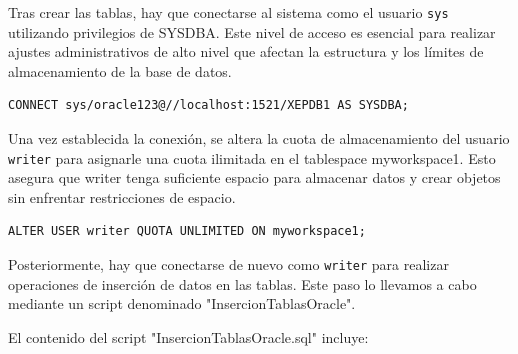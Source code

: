 \documentclass{article}
\begin{document}
Tras crear las tablas, hay que conectarse al sistema como el usuario \texttt{sys} utilizando privilegios de SYSDBA. Este nivel de acceso es esencial para realizar ajustes administrativos de alto nivel que afectan la estructura y los límites de almacenamiento de la base de datos.

\begin{lstlisting}[style=bashStyle]
CONNECT sys/oracle123@//localhost:1521/XEPDB1 AS SYSDBA;
\end{lstlisting}

Una vez establecida la conexión, se altera la cuota de almacenamiento del usuario \texttt{writer} para asignarle una cuota ilimitada en el tablespace myworkspace1. Esto asegura que writer tenga suficiente espacio para almacenar datos y crear objetos sin enfrentar restricciones de espacio.

\begin{lstlisting}[style=bashStyle]
ALTER USER writer QUOTA UNLIMITED ON myworkspace1;
\end{lstlisting}

Posteriormente, hay que conectarse de nuevo como \texttt{writer} para realizar operaciones de inserción de datos en las tablas. Este paso lo llevamos a cabo mediante un script denominado "InsercionTablasOracle". 

El contenido del script "InsercionTablasOracle.sql" incluye:
\end{document}
